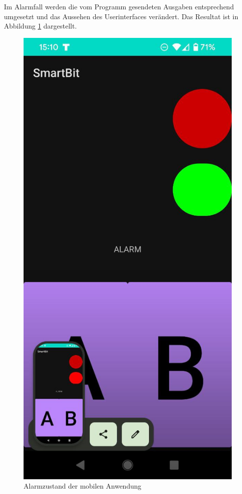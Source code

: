 \documentclass[11pt,a4paper]{report}
\begin{document}
Im Alarmfall werden die vom Programm gesendeten Ausgaben entsprechend umgesetzt und das Aussehen des Userinterfaces verändert.
Das Resultat ist in Abbildung \ref{fig:app_alarm} dargestellt.
\begin{figure}[htbp]
  \centering
  \includegraphics[height=0.4\textheight]{images/app_alarm}
  \caption{Alarmzustand der mobilen Anwendung}
  \label{fig:app_alarm}
\end{figure}
\end{document}
